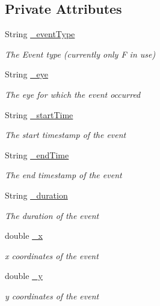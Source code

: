 \subsection*{Private Attributes}
\begin{DoxyCompactItemize}
\item 
String \hyperlink{class_web_analyzer_1_1_models_1_1_base_1_1_raw_tracking_event_a3ee648e74d655dafd488eef0c9ee0aeb}{\+\_\+event\+Type}
\begin{DoxyCompactList}\small\item\em The Event type (currently only F in use) \end{DoxyCompactList}\item 
String \hyperlink{class_web_analyzer_1_1_models_1_1_base_1_1_raw_tracking_event_a710dcc04f5eb33ccc9c6ba2b7cd991ed}{\+\_\+eye}
\begin{DoxyCompactList}\small\item\em The eye for which the event occurred \end{DoxyCompactList}\item 
String \hyperlink{class_web_analyzer_1_1_models_1_1_base_1_1_raw_tracking_event_a72306d985d302cae91cdf57ee9db667d}{\+\_\+start\+Time}
\begin{DoxyCompactList}\small\item\em The start timestamp of the event \end{DoxyCompactList}\item 
String \hyperlink{class_web_analyzer_1_1_models_1_1_base_1_1_raw_tracking_event_ad38ed6682d18d1ff4aebc5185a145739}{\+\_\+end\+Time}
\begin{DoxyCompactList}\small\item\em The end timestamp of the event \end{DoxyCompactList}\item 
String \hyperlink{class_web_analyzer_1_1_models_1_1_base_1_1_raw_tracking_event_afbef9b63be3062a1b78772f91c6d0afb}{\+\_\+duration}
\begin{DoxyCompactList}\small\item\em The duration of the event \end{DoxyCompactList}\item 
double \hyperlink{class_web_analyzer_1_1_models_1_1_base_1_1_raw_tracking_event_a10d86c244a5c86ec2f1c29518a4db4b7}{\+\_\+x}
\begin{DoxyCompactList}\small\item\em x coordinates of the event \end{DoxyCompactList}\item 
double \hyperlink{class_web_analyzer_1_1_models_1_1_base_1_1_raw_tracking_event_a3c6afdca9f26e3549fbc847df3f5aab7}{\+\_\+y}
\begin{DoxyCompactList}\small\item\em y coordinates of the event \end{DoxyCompactList}\end{DoxyCompactItemize}


